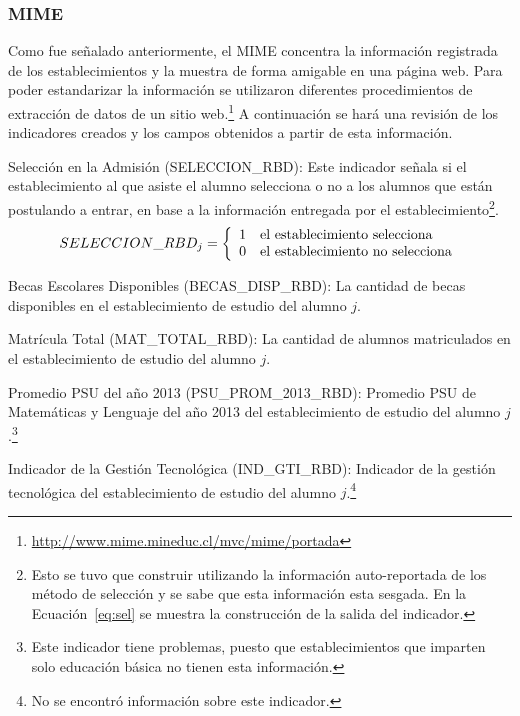 \subsubsection{MIME}
Como fue señalado anteriormente, el MIME concentra la información registrada de los establecimientos y la muestra de forma amigable en una página web. Para poder estandarizar la información se utilizaron diferentes procedimientos de extracción de datos de un sitio web.\footnote{\url{ http://www.mime.mineduc.cl/mvc/mime/portada}}
A continuación se hará una revisión de los indicadores creados y los campos obtenidos a partir de esta información.
\begin{longdescription}
     \item[Selección en la Admisión](SELECCION\_RBD): Este indicador señala si el establecimiento al que asiste el alumno selecciona o no a los alumnos que están postulando a entrar, en base a la información entregada por el establecimiento\footnote{Esto se tuvo que construir utilizando la información auto-reportada de los método de selección y se sabe que esta información esta sesgada. En la Ecuación~\ref{eq:sel} se muestra la construcción de la salida del indicador.}.
              \begin{equation}
              \centering
              SELECCION\_RBD_{j} = \left\{
                \begin{array}{c l}
                 1 & \mbox{el establecimiento selecciona}\\
                 0 & \mbox{el establecimiento no selecciona}
                \end{array}
                \right.
                \label{eq:sel}
              \end{equation}
     \item[Becas Escolares Disponibles](BECAS\_DISP\_RBD): La cantidad de becas disponibles en el establecimiento de estudio del alumno $j$.
     \item[Matrícula Total](MAT\_TOTAL\_RBD): La cantidad de alumnos matriculados en el establecimiento de estudio del alumno $j$.
     \item[Promedio PSU del año 2013](PSU\_PROM\_2013\_RBD):
     Promedio PSU de Matemáticas y Lenguaje del año 2013 del establecimiento de estudio del alumno $j$.\footnote{Este indicador tiene problemas, puesto que establecimientos que imparten solo educación básica no tienen esta información.}
     \item[Indicador de la Gestión Tecnológica](IND\_GTI\_RBD):
     Indicador de la gestión tecnológica del establecimiento de estudio del alumno $j$.\footnote{No se encontró información sobre este indicador.}

\end{longdescription}
